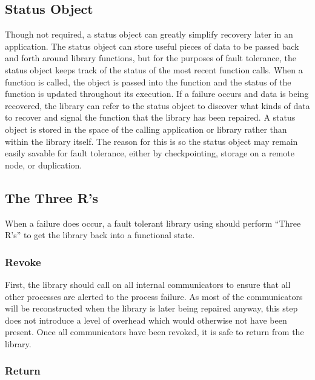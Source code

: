 \subsection{Status Object}
\label{subsec:apps:library:status}

Though not required, a status object can greatly simplify recovery later in an 
application. The status object can store useful pieces of data to be passed back 
and forth around library functions, but for the purposes of fault tolerance, the 
status object keeps track of the status of the most recent function calls. When 
a function is called, the object is passed into the function and the 
status of the function is updated throughout its execution. If a failure occurs 
and data is being recovered, the library can refer to the status object to 
discover what kinds of data to recover and signal the function that the library 
has been repaired. A status object is stored in the space of the calling 
application or library rather than within the library itself. The reason for 
this is so the status object may remain easily savable for fault tolerance, either 
by checkpointing, storage on a remote node, or duplication. 

\subsection{The Three R's}

When a failure does occur, a fault tolerant library using \ulfm should perform 
``Three R's'' to get the library back into a functional state.

\subsubsection{Revoke}

First, the library should call  on all internal communicators 
to ensure that all other processes are alerted to the process failure. As most 
of the communicators will be reconstructed when the library is later being 
repaired anyway, this step does not introduce a level of overhead which would 
otherwise not have been present. Once all communicators have been revoked, it is 
safe to return from the library.

\subsubsection{Return}

